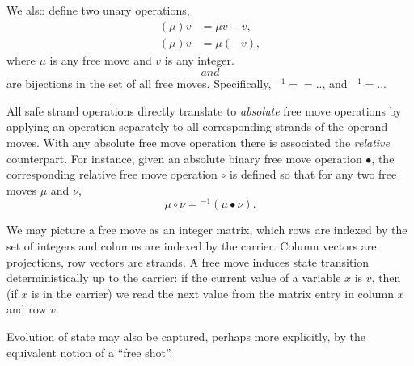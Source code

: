 \documentclass [a4paper,12pt] {article}
\theoremstyle{definition}
\newcommand{\relative}{}
\DeclareRobustCommand{\relative}{\mathop{\textstyle\mathsmaller{\bf {Rel}}}}
\newcommand{\negative}{}
\DeclareRobustCommand{\negative}{\mathop{\textstyle\mathsmaller{\bf {Neg}}}}
\begin{document}
We also define two unary operations,
%
\begin {align*}
  (\relative{\mu})v &= \mu v - v,\\
  (\negative{\mu})v &= \mu (-v),
\end {align*}
%
where $\mu$ is any free move and $v$ is any integer. $\relative$ and
$\negative$ are bijections in the set of all free moves.
Specifically, $\negative^{-1} = \negative = \relative . \negative
. \relative$, and $\relative^{-1} = \negative . \relative
. \negative$.

All safe strand operations directly translate to {\em absolute}\/ free
move operations by applying an operation separately to all
corresponding strands of the operand moves.  With any absolute free
move operation there is associated the {\em relative}\/ counterpart.
For instance, given an absolute binary free move operation $\bullet$,
the corresponding relative free move operation $\circ$ is defined so
that for any two free moves $\mu$ and $\nu$,
%
\[\mu \circ \nu = {\relative}^{-1}{(\relative{\mu} \bullet
  \relative{\nu})}.\]

We may picture a free move as an integer matrix, which rows are
indexed by the set of integers and columns are indexed by the carrier.
Column vectors are projections, row vectors are strands.  A free move
induces state transition deterministically up to the carrier: if the
current value of a variable $x$ is $v$, then (if $x$ is in the
carrier) we read the next value from the matrix entry in column $x$
and row $v$.

Evolution of state may also be captured, perhaps more explicitly, by
the equivalent notion of a ``free shot''.
\end{document}

